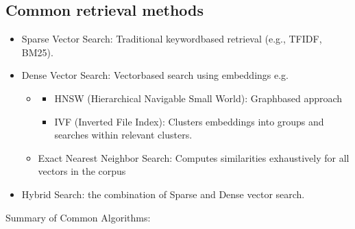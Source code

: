 \documentclass[letterpaper,11pt,english]{sphinxmanual}
\begin{document}
\subsection{Common retrieval methods}
\label{\detokenize{rag:common-retrieval-methods}}\begin{itemize}
\item {} 
\sphinxAtStartPar
Sparse Vector Search: Traditional keyword\sphinxhyphen{}based retrieval (e.g., TF\sphinxhyphen{}IDF, BM25).

\item {} 
\sphinxAtStartPar
Dense Vector Search: Vector\sphinxhyphen{}based search using embeddings e.g.
\begin{itemize}
\item {} \begin{description}
\begin{itemize}
\item {} 
\sphinxAtStartPar
HNSW (Hierarchical Navigable Small World): Graph\sphinxhyphen{}based approach

\item {} 
\sphinxAtStartPar
IVF (Inverted File Index): Clusters embeddings into groups and searches within relevant clusters.

\end{itemize}

\end{description}

\item {} 
\sphinxAtStartPar
Exact Nearest Neighbor Search: Computes similarities exhaustively for all vectors in the corpus

\end{itemize}

\item {} 
\sphinxAtStartPar
Hybrid Search: the combination of Sparse and Dense vector search.

\end{itemize}

\sphinxAtStartPar
Summary of Common Algorithms:
\end{document}
